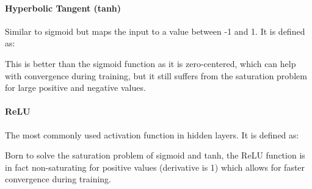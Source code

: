 \paragraph{Hyperbolic Tangent (tanh)}
Similar to sigmoid but maps the input to a value between -1 and 1. It is defined as:
\begin{figure}[H]
    \centering
    
\end{figure}
This is better than the sigmoid function as it is zero-centered, which can help with convergence during training,
but it still suffers from the saturation problem for large positive and negative values.

\paragraph{ReLU}
The most commonly used activation function in hidden layers. It is defined as:
\begin{figure}[H]
    \centering
    
\end{figure}
Born to solve the saturation problem of sigmoid and tanh, the ReLU function is in fact non-saturating for positive values (derivative is 1) which allows for faster convergence during training.

